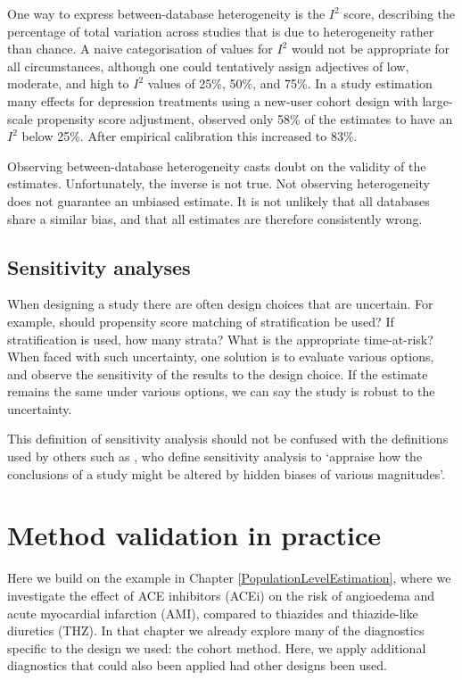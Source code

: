 \documentclass[11pt]{book}
\let\BeginKnitrBlock\begin \let\EndKnitrBlock\end
\begin{document}
One way to express between-database heterogeneity is the \(I^2\) score,
describing the percentage of total variation across studies that is due
to heterogeneity rather than chance. \citep{higgins_2003} A naive
categorisation of values for \(I^2\) would not be appropriate for all
circumstances, although one could tentatively assign adjectives of low,
moderate, and high to \(I^2\) values of 25\%, 50\%, and 75\%. In a study
estimation many effects for depression treatments using a new-user
cohort design with large-scale propensity score adjustment,
\citet{schuemie_2018b} observed only 58\% of the estimates to have an
\(I^2\) below 25\%. After empirical calibration this increased to 83\%.

\BeginKnitrBlock{rmdimportant}
Observing between-database heterogeneity casts doubt on the validity of
the estimates. Unfortunately, the inverse is not true. Not observing
heterogeneity does not guarantee an unbiased estimate. It is not
unlikely that all databases share a similar bias, and that all estimates
are therefore consistently wrong.
\EndKnitrBlock{rmdimportant}

\subsection{Sensitivity analyses}\label{sensitivity-analyses}

When designing a study there are often design choices that are
uncertain. For example, should propensity score matching of
stratification be used? If stratification is used, how many strata? What
is the appropriate time-at-risk? When faced with such uncertainty, one
solution is to evaluate various options, and observe the sensitivity of
the results to the design choice. If the estimate remains the same under
various options, we can say the study is robust to the uncertainty.

This definition of sensitivity analysis should not be confused with the
definitions used by others such as \citet{rosenbaum_2005}, who define
sensitivity analysis to `appraise how the conclusions of a study might
be altered by hidden biases of various magnitudes'.

\section{Method validation in
practice}\label{method-validation-in-practice}

Here we build on the example in Chapter \ref{PopulationLevelEstimation},
where we investigate the effect of ACE inhibitors (ACEi) on the risk of
angioedema and acute myocardial infarction (AMI), compared to thiazides
and thiazide-like diuretics (THZ). In that chapter we already explore
many of the diagnostics specific to the design we used: the cohort
method. Here, we apply additional diagnostics that could also been
applied had other designs been used.
\end{document}
